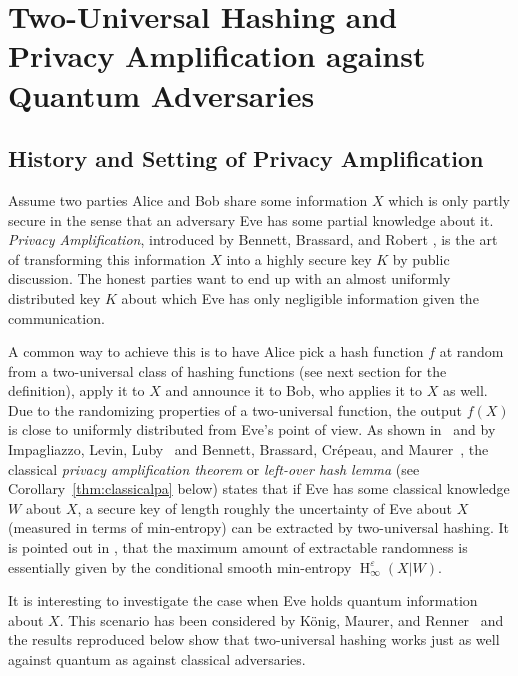\documentclass[final,11pt,a4paper]{report}
\renewcommand*{\H}{\operatorname{H}}   %
\newcommand*{\eps}{\varepsilon}
\begin{document}
\section[Two-Universal Hashing and Privacy Amplification] {Two-Universal Hashing and Privacy Amplification against Quantum Adversaries} \label{sec:pa}
\subsection{History and Setting of Privacy Amplification}
Assume two parties Alice and Bob share some information $X$ which is
only partly secure in the sense that an adversary Eve has some partial
knowledge about it. \emph{Privacy Amplification}, introduced by Bennett,
Brassard, and Robert \cite{BBR88}, is the art of transforming this
information $X$ into a highly secure key $K$ by public discussion. The
honest parties want to end up with an almost uniformly distributed key
$K$ about which Eve has only negligible information given the
communication.

A common way to achieve this is to have Alice pick a hash function $f$
at random from a two-universal class of hashing functions (see next
section for the definition), apply it to $X$ and announce it to Bob,
who applies it to $X$ as well. Due to the randomizing properties of a
two-universal function, the output $f(X)$ is close to uniformly
distributed from Eve's point of view. As shown in~\cite{BBR88} and by
Impagliazzo, Levin, Luby~\cite{ILL89} and Bennett, Brassard,
Cr\'epeau, and Maurer~\cite{BBCM95}, the classical \emph{privacy
  amplification theorem} or \emph{left-over hash lemma} (see
Corollary~\ref{thm:classicalpa} below) states that if Eve has some
classical knowledge $W$ about $X$, a secure key of length roughly the
uncertainty of Eve about $X$ (measured in terms of
min-entropy) can be extracted by
two-universal hashing. It is pointed out
in \cite{RW05}, that the maximum amount of extractable randomness is
essentially given by the conditional smooth min-entropy
$\H_{\infty}^{\eps}(X | W)$. 

It is interesting to investigate the case when Eve holds quantum
information about $X$. This scenario has been considered by K\"onig,
Maurer, and Renner~\cite{KMR03, RK05, Renner05} and the results
reproduced below show that two-universal hashing works just as well
against quantum as against classical adversaries.
\end{document}
